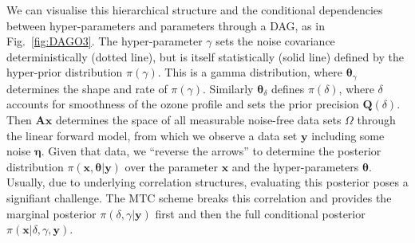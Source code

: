 We can visualise this hierarchical structure and the conditional dependencies between hyper-parameters and parameters through a DAG, as in Fig.~\ref{fig:DAGO3}.
The hyper-parameter $\gamma$ sets the noise covariance deterministically (dotted line), but is itself statistically (solid line) defined by the hyper-prior distribution $\pi(\gamma)$.
This is a gamma distribution, where $\bm{\theta}_{\gamma}$ determines the shape and rate of $\pi(\gamma)$.
Similarly $\bm{\theta}_{\delta}$ defines $\pi(\delta)$, where $\delta$ accounts for smoothness of the ozone profile and sets the prior precision $\bm{Q}(\delta)$.
Then $\bm{A}\bm{x}$ determines the space of all measurable noise-free data sets $\Omega$ through the linear forward model, from which we observe a data set $\bm{y}$ including some noise $\bm{\eta}$.
Given that data, we ``reverse the arrows'' to determine the posterior distribution $\pi(\bm{x}, \bm{\theta}|\bm{y})$ over the parameter $\bm{x}$ and the hyper-parameters $\bm{\theta}$.
Usually, due to underlying correlation structures, evaluating this posterior poses a signifiant challenge.
The MTC scheme breaks this correlation and provides the marginal posterior $\pi(\delta, \gamma | \bm{y})$ first and then the full conditional posterior $\pi(\bm{x}|\delta, \gamma,\bm{y})$.

